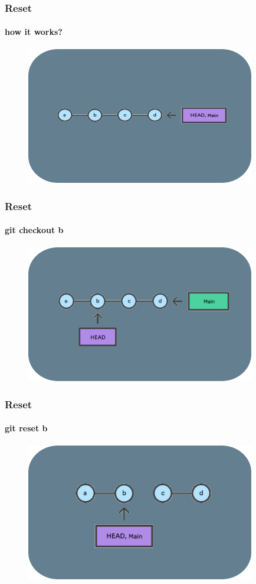 \documentclass{beamer}
\begin{document}
	\begin{frame}
	\frametitle{Reset}
	\framesubtitle{how it works?}
	\begin{figure}[htbp]
			\includegraphics[width=10cm]{reset1}
	\end{figure}
	\end{frame}
	
	\begin{frame}
	\frametitle{Reset}
	\framesubtitle{git checkout b}
	\begin{figure}[htbp]
			\includegraphics[width=10cm]{reset2}
	\end{figure}
	\end{frame}
	
	\begin{frame}
	\frametitle{Reset}
	\framesubtitle{git reset b}
	\begin{figure}[htbp]
			\includegraphics[width=10cm]{reset3}
	\end{figure}
	\end{frame}
	
\end{document}
